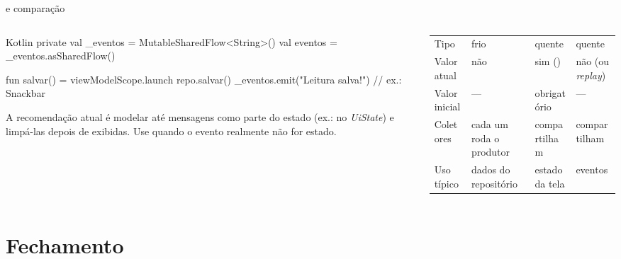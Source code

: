 \documentclass[aspectratio=169,10pt]{beamer}
\begin{document}
\begin{frame}[fragile]{ e comparação}
  \begin{columns}[T]
    \begin{column}{0.48\textwidth}
\begin{codigo}[title=Eventos de uso único]{Kotlin}
private val _eventos = MutableSharedFlow<String>()
val eventos = _eventos.asSharedFlow()

fun salvar() = viewModelScope.launch {
  repo.salvar()
  _eventos.emit("Leitura salva!")   // ex.: Snackbar
}
\end{codigo}
      \begin{dica}
        A recomendação atual é modelar até mensagens como parte do estado (ex.:  no \emph{UiState}) e limpá-las depois de exibidas. Use  quando o evento realmente não for estado.
      \end{dica}
    \end{column}
    \begin{column}{0.50\textwidth}
      \scriptsize
      \begin{tabularx}{\linewidth}{@{}l L L L@{}}
        \toprule
        &  &  &  \\
        \midrule
        Tipo & frio & quente & quente \\
        Valor atual & não & sim () & não (ou \emph{replay}) \\
        Valor inicial & --- & obrigatório & --- \\
        Coletores & cada um roda o produtor & compartilham & compartilham \\
        Uso típico & dados do repositório & estado da tela & eventos \\
        \bottomrule
      \end{tabularx}
    \end{column}
  \end{columns}
\end{frame}

\section{Fechamento}
\end{document}
